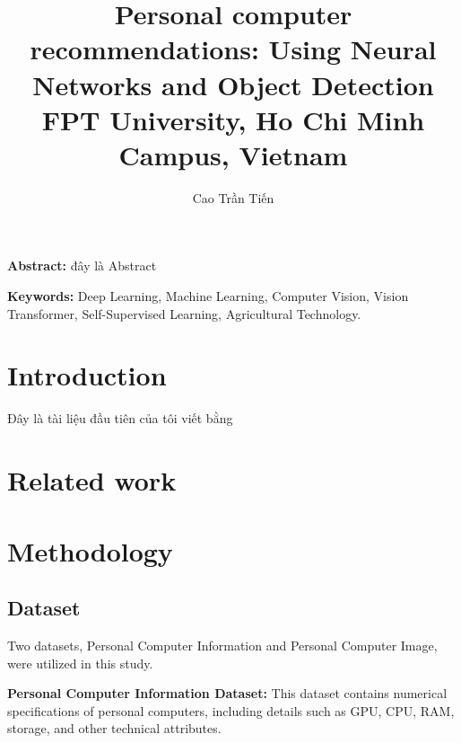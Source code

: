 \documentclass{article}
\title{Personal computer recommendations: Using Neural Networks and Object Detection \\ {\large FPT University, Ho Chi Minh Campus, Vietnam}}
\author{Cao Trần Tiến}
\date{}
\begin{document}
\maketitle

\begin{flushleft}
    \textbf{Abstract:} đây là Abstract
\end{flushleft}

\begin{flushleft}
    \textbf{Keywords:} Deep Learning, Machine Learning, Computer Vision, Vision Transformer, Self-Supervised Learning, Agricultural Technology.
\end{flushleft}

\section{Introduction}
Đây là tài liệu đầu tiên của tôi viết bằng

\section{Related work}

\section{Methodology}

\subsection{Dataset}
\begin{justify}
Two datasets, Personal Computer Information and Personal Computer Image, were utilized in this study.
\end{justify}

\begin{justify}
\textbf{Personal Computer Information Dataset:}  
This dataset contains numerical specifications of personal computers, including details such as GPU, CPU, RAM, storage, and other technical attributes.
\end{justify}
\end{document}
